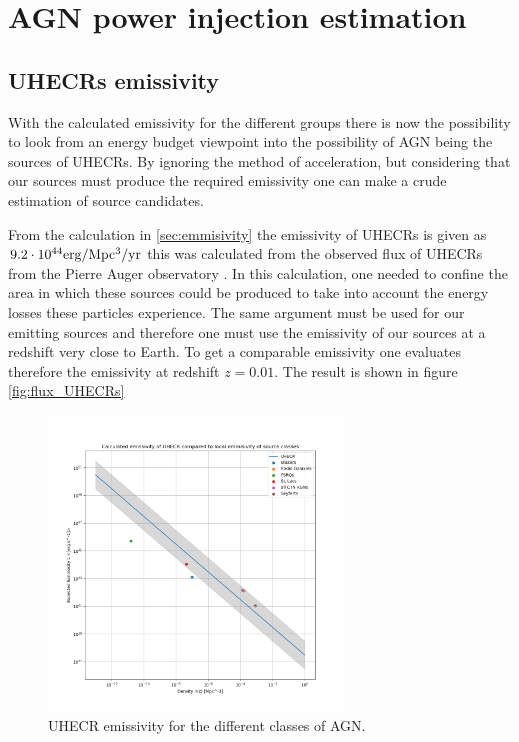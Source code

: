 \section{AGN power injection estimation}
\subsection{UHECRs emissivity}
With the calculated emissivity for the different groups there is now the possibility to look from an energy budget viewpoint into the possibility of AGN being the sources of UHECRs. 
By ignoring the method of acceleration, but considering that our sources must produce the required emissivity one can make a crude estimation of source candidates. 

From the calculation in \ref{sec:emmisivity} the emissivity of UHECRs is given as $9.2 \cdot 10^{44}\rm erg/\rm Mpc^3\rm /yr$ this was calculated from the observed flux of UHECRs from the Pierre Auger observatory \cite{thepierreaugercollaboration2017pierre}.
In this calculation, one needed to confine the area in which these sources could be produced to take into account the energy losses these particles experience. The same argument must be used 
for our emitting sources and therefore one must use the emissivity of our sources at a redshift very close to Earth. To get a comparable emissivity one evaluates therefore the emissivity at redshift $z=0.01$. The result is shown in figure \ref*{fig:flux_UHECRs}

\begin{figure}[H]
    \centering
    \includegraphics[width = 0.7\textwidth]{new_plots/L_n_uhecr_calc.png}
    \caption{UHECR emissivity for the different classes of AGN.}
    \label{fig:UHECR}
\end{figure}


